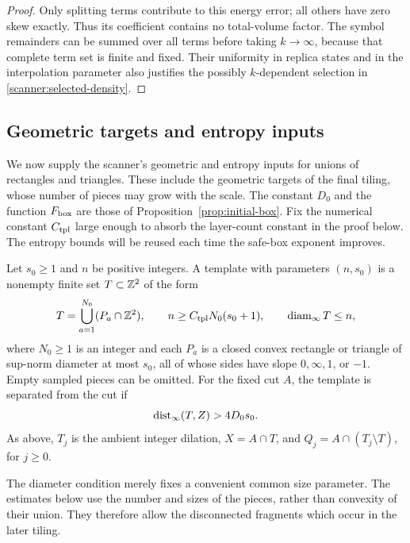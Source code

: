 \begin{proof}
Only splitting terms contribute to this energy error; all others have
zero skew exactly.  Thus its coefficient contains no total-volume
factor.  The symbol remainders can be summed over all terms before
taking \(k\to\infty\), because that complete term set is finite and
fixed.  Their uniformity in replica states and in the interpolation
parameter also justifies the possibly \(k\)-dependent selection in
\eqref{scanner:selected-density}.
\end{proof}

\subsection{Geometric targets and entropy inputs}

We now supply the scanner's geometric and entropy inputs for unions of
rectangles and triangles.  These include the geometric targets of the final
tiling, whose number of pieces may grow with the scale.  The constant
\(D_0\) and the function \(F_{\rm box}\) are those of
Proposition~\ref{prop:initial-box}.  Fix the numerical constant
\(C_{\rm tpl}\) large enough to absorb the layer-count constant in the
proof below.  The entropy bounds will be reused each time the safe-box
exponent improves.

\begin{definition}[A template]
\label{scanner:template}
Let \(s_0\ge1\) and \(n\) be positive integers.  A template with parameters
\((n,s_0)\) is a nonempty finite set \(T\subset\mathbb Z^2\) of the form
\[
 T=\bigcup_{a=1}^{N_0}(P_a\cap\mathbb Z^2),
 \qquad n\ge C_{\rm tpl}N_0(s_0+1),
 \qquad \operatorname{diam}_\infty T\le n,
\]
where \(N_0\ge1\) is an integer and each \(P_a\) is a closed convex rectangle or triangle of sup-norm
diameter at most \(s_0\), all of whose sides have slope
\(0,\infty,1\), or \(-1\).  Empty sampled pieces can be omitted.
For the fixed cut \(A\), the template is separated from the cut if
\[
 \operatorname{dist}_\infty(T,Z)>4D_0s_0.
\]
As above, \(T_j\) is the ambient integer dilation,
\(X=A\cap T\), and \(Q_j=A\cap(T_j\setminus T)\), for \(j\ge0\).
\end{definition}

The diameter condition merely fixes a convenient common size parameter.
The estimates below use the number and sizes of the pieces, rather than
convexity of their union.  They therefore allow the disconnected fragments
which occur in the later tiling.

